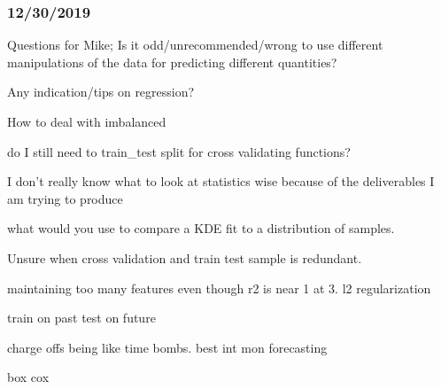 \subsubsection{12/30/2019}
Questions for Mike;
Is it odd/unrecommended/wrong to use different manipulations of the data
for predicting different quantities?

Any indication/tips on regression?

How to deal with imbalanced

do I still need to train_test split for cross validating functions?

I don't really know what to look at statistics wise because of
the deliverables I am trying to produce 

what would you use to compare a KDE fit to a distribution of samples. 


Unsure when cross validation and train test sample is redundant.

maintaining too many features even though r2 is near 1 at 3.
l2 regularization

train on past test on future

charge offs being like time bombs.
best 
int mon forecasting

box cox